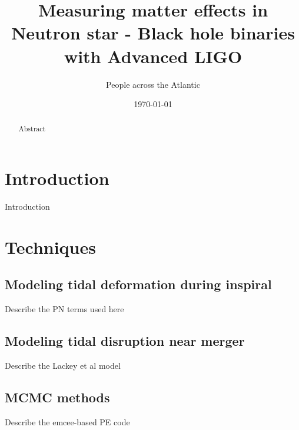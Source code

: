 \documentclass[aps,prd,amsmath,floats,floatfix, twocolumn,
superscriptaddress,nofootinbib,showpacs]{revtex4-1}
\begin{document}
\title{
Measuring matter effects in Neutron star - Black hole binaries with Advanced LIGO
}

\author{People across the Atlantic}

\date{\today}

\begin{abstract}
Abstract
\end{abstract}

\pacs{}

\maketitle

\section{Introduction}
Introduction

\section{Techniques}
\subsection{Modeling tidal deformation during inspiral}
Describe the PN terms used here

\subsection{Modeling tidal disruption near merger}
Describe the Lackey et al model

\subsection{MCMC methods}
Describe the emcee-based PE code
\end{document}
